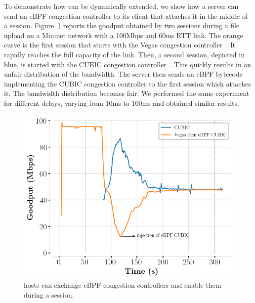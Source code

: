 To demonstrate how \tcpls can be dynamically extended, we show how a server can 
send an eBPF congestion controller to its client that attaches it in the middle 
of a \tcpls session. Figure~\ref{fig:vegasCubic} reports the goodput obtained 
by two \tcpls sessions during a file upload on a Mininet network with a 
100Mbps and 60ms RTT link.
The orange curve is the first \tcpls session that starts with the Vegas 
congestion controller~\cite{brakmo1994tcp}. It rapidly reaches the 
full capacity of the link. Then, a second \tcpls session, depicted in blue, is 
started with the CUBIC congestion controller~\cite{rfc8312}. This quickly 
results in an unfair distribution of the bandwidth. The server then sends an 
eBPF bytecode implementing the CUBIC congestion controller to the first \tcpls 
session which attaches it. The bandwidth distribution becomes fair. We 
performed the same experiment for different delays, varying from 10ms to 100ms 
and obtained similar results.

\begin{figure}[!t]
  \begin{center}
    \includegraphics[width=.8\columnwidth]{pretty_plotify/plots/vegas_cubic.png}
  \end{center}
\vspace{-0.5cm}
  \caption{\tcpls hosts can exchange eBPF congestion controllers and enable 
  them during a \tcpls session.}
  \label{fig:vegasCubic}
\end{figure}
